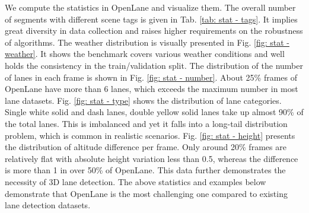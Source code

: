 \documentclass[runningheads]{llncs}
\begin{document}
We compute the statistics in OpenLane and visualize them.
The overall number of segments with different scene tags is given in Tab. \ref{tab: stat - tags}. It implies great diversity in data collection and raises higher requirements on the robustness of algorithms.
The weather distribution is visually presented 
in Fig. \ref{fig: stat - weather}. It shows the benchmark covers various weather conditions and well holds the consistency in the train/validation split.
The distribution of the number of lanes in each frame is shown in Fig. \ref{fig: stat - number}. About 25\% frames of OpenLane have more than 6 lanes, which exceeds the maximum number in most lane datasets. 
Fig. \ref{fig: stat - type} shows the distribution of lane categories. 
Single white solid and dash lanes, double yellow solid lanes take up almost 90\% of the total lanes. This is imbalanced and yet it falls into a long-tail distribution problem, which is common in realistic scenarios. 
Fig. \ref{fig: stat - height} presents the distribution of altitude difference per frame. Only around 20\% frames are relatively flat with absolute height variation less than 0.5, whereas the difference is more than 1 in over 50\% of OpenLane. This data further demonstrates the necessity of 3D lane detection.
The above statistics and examples below demonstrate that OpenLane is the most challenging one compared to existing lane detection datasets.
\end{document}
